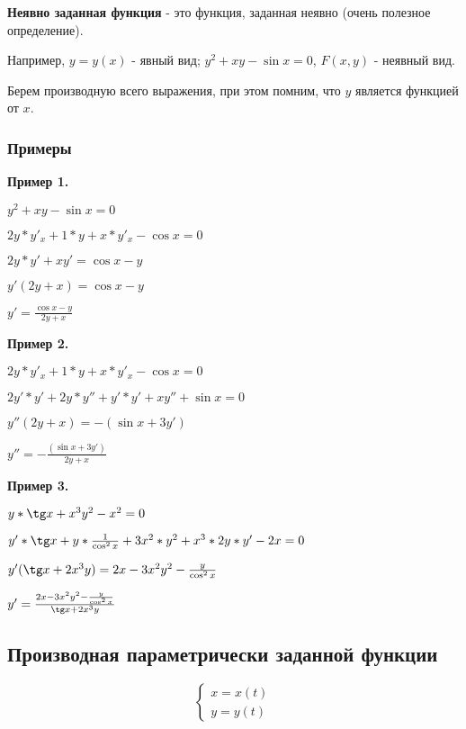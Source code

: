 \documentclass{article}
\begin{document}
\begin{flushleft}

\textbf{Неявно заданная функция} - это функция, заданная неявно (очень полезное определение).

Например, $y = y(x)$ - явный вид; $y^2 + xy - \sin x = 0$, $F(x, y)$ - неявный вид.

\hfill

Берем производную всего выражения, при этом помним, что $y$ является функцией от $x$.

\subsubsection{Примеры}

\parbox{0.5\textwidth}{
\textbf{Пример 1.}

$y^2 + x y - \sin x = 0$

$2y * y'_x + 1 * y + x * y'_x - \cos x = 0$

$2y * y' + x y' = \cos x - y$

$y'(2y + x) = \cos x - y$

$y' = \frac{\cos x - y}{2y + x}$

\bigskip
\textbf{Пример 2.}

$2y * y'_x + 1 * y + x * y'_x - \cos x = 0$

$2y' * y' + 2y * y'' + y' * y' + xy'' + \sin x = 0$

$y''(2y + x) = -(\sin x + 3y')$

$y'' = -\frac{(\sin x + 3y')}{2y + x}$
}
\hfill
\parbox{0.4\textwidth}{
\textbf{Пример 3.}

$y * \tg x + x^3 y^2 - x^2 = 0$

$y' * \tg x + y * \frac{1}{\cos^2 x} + 3x^2 * y^2 + x^3 * 2y * y' - 2x = 0$

$y'(\tg x + 2x^3y) = 2x - 3 x^2 y^2 - \frac{y}{\cos^2 x}$

$y' = \frac{2x - 3 x^2 y^2 - \frac{y}{\cos^2 x}}{\tg x + 2 x^3 y}$
}

\subsection{Производная параметрически заданной функции}

\begin{equation}
    \begin{cases}
        x = x(t) \\
        y = y(t)
    \end{cases}
\end{equation}


\end{flushleft}
\end{document}
